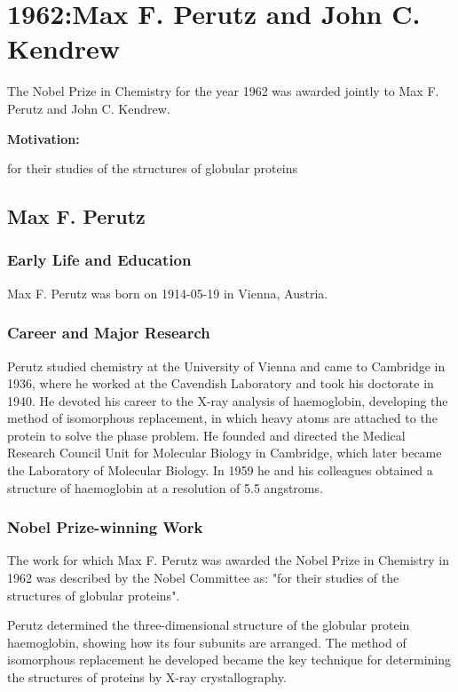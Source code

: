 \chapter{1962:Max F. Perutz and John C. Kendrew}

\label{chap:chemistry1962}

The Nobel Prize in Chemistry for the year 1962 was awarded jointly to Max F. Perutz and John C. Kendrew.

\textbf{Motivation:}

for their studies of the structures of globular proteins

\section{Max F. Perutz}

\subsection*{Early Life and Education}

Max F. Perutz was born on 1914-05-19 in Vienna, Austria.

\subsection*{Career and Major Research}

Perutz studied chemistry at the University of Vienna and came to Cambridge in 1936, where he worked at the Cavendish Laboratory and took his doctorate in 1940. He devoted his career to the X-ray analysis of haemoglobin, developing the method of isomorphous replacement, in which heavy atoms are attached to the protein to solve the phase problem. He founded and directed the Medical Research Council Unit for Molecular Biology in Cambridge, which later became the Laboratory of Molecular Biology. In 1959 he and his colleagues obtained a structure of haemoglobin at a resolution of 5.5 angstroms.

\subsection*{Nobel Prize-winning Work}

The work for which Max F. Perutz was awarded the Nobel Prize in Chemistry in 1962 was described by the Nobel Committee as: "for their studies of the structures of globular proteins".

Perutz determined the three-dimensional structure of the globular protein haemoglobin, showing how its four subunits are arranged. The method of isomorphous replacement he developed became the key technique for determining the structures of proteins by X-ray crystallography.

